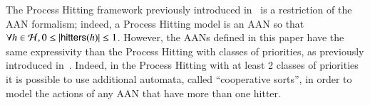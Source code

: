 \begin{comment}
Finally, we define the support (\pref{def:supp}) of a sequence of actions $\zeta$
as the set containing the first local state of each automata appearing in $\zeta$,
that is, as a hitter or as a target.
For this, we first define the \emph{first appearance} of an automata
in this sequence.

\begin{definition}[$\supp$ \& $\first$]
\label{def:supp}
  For all sequences of actions $\zeta$, we define:
  \[
    \suppf{\zeta} = \bigcup_{a \in \PHs} \firstf{a}{\zeta}
  \]
  where:
  \begin{align*}
  \forall a \in \PHs, \firstf{a}{\zeta} &=
    \begin{cases}
      \emptyset &
        \text{if } \forall n \in \indexes{\zeta},
        B^\zeta_n \cap \PHl_a \neq \emptyset \\
      B^\zeta_m \cap \PHl_a &
        \text{else, if } m =
        \min\{ n \in \indexes{\zeta} \mid B^\zeta_n \cap \PHl_a \neq \emptyset \}
    \end{cases} \\
  \forall n \in \indexes{\zeta}, B^\zeta_n &= \hitter{\zeta_n} \cup \{ \target{\zeta_n} \}.
  \end{align*}
\end{definition}

We note that for all sequence of actions $\zeta$,
$\forall a \in \PHs, 0 \leq \card{\firstf{a}{\zeta}} \leq 1$,
because given the particular for of the actions of an AAN (see \pref{def:ph}),
$\forall n \in \indexes{\zeta}, B_n \in \PHsublset[\PHl]$.
This also means that: $\suppf{\zeta} \in \PHsublset[\PHl]$.

\end{comment}



\begin{remark}
  The Process Hitting framework
  previously introduced in~\cite{PMR10-TCSB}
  is a restriction of the AAN formalism;
  indeed, a Process Hitting model is an AAN so that
  $\forall h \in \mathcal{H}, 0 \leq |\mathsf{hitters}(h)| \leq 1$.
  However, the AANs defined in this paper have the same expressivity than
  the Process Hitting with classes of priorities, as previously
  introduced in~\cite{FPMR13-CS2Bio}.
  Indeed, in the Process Hitting with at least 2 classes of priorities
  it is possible to use additional automata, called “cooperative sorts”,
  in order to model the actions of any AAN that have more than one hitter.
\end{remark}
